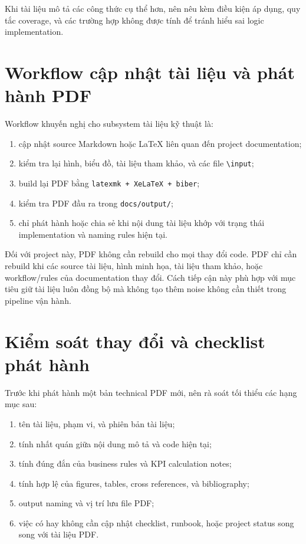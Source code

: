 Khi tài liệu mô tả các công thức cụ thể hơn, nên nêu kèm điều kiện áp dụng, quy tắc coverage, và các trường hợp không được tính để tránh hiểu sai logic implementation.

\section{Workflow cập nhật tài liệu và phát hành PDF}

Workflow khuyến nghị cho subsystem tài liệu kỹ thuật là:

\begin{enumerate}[label=-]
\item cập nhật source Markdown hoặc LaTeX liên quan đến project documentation;
\item kiểm tra lại hình, biểu đồ, tài liệu tham khảo, và các file \texttt{\textbackslash input};
\item build lại PDF bằng \texttt{latexmk + XeLaTeX + biber};
\item kiểm tra PDF đầu ra trong \texttt{docs/output/};
\item chỉ phát hành hoặc chia sẻ khi nội dung tài liệu khớp với trạng thái implementation và naming rules hiện tại.
\end{enumerate}

Đối với project này, PDF không cần rebuild cho mọi thay đổi code. PDF chỉ cần rebuild khi các source tài liệu, hình minh họa, tài liệu tham khảo, hoặc workflow/rules của documentation thay đổi. Cách tiếp cận này phù hợp với mục tiêu giữ tài liệu luôn đồng bộ mà không tạo thêm noise không cần thiết trong pipeline vận hành.

\section{Kiểm soát thay đổi và checklist phát hành}

Trước khi phát hành một bản technical PDF mới, nên rà soát tối thiểu các hạng mục sau:

\begin{enumerate}[label=-]
\item tên tài liệu, phạm vi, và phiên bản tài liệu;
\item tính nhất quán giữa nội dung mô tả và code hiện tại;
\item tính đúng đắn của business rules và KPI calculation notes;
\item tính hợp lệ của figures, tables, cross references, và bibliography;
\item output naming và vị trí lưu file PDF;
\item việc có hay không cần cập nhật checklist, runbook, hoặc project status song song với tài liệu PDF.
\end{enumerate}

